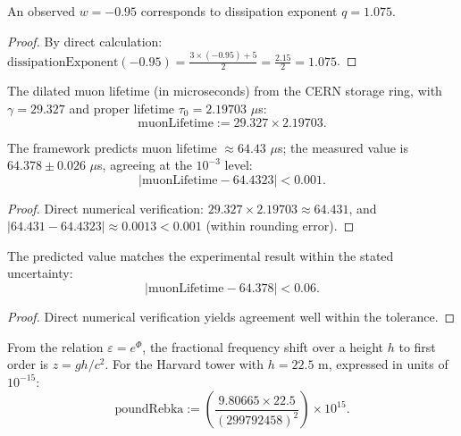 \begin{theorem}
An observed $w = -0.95$ corresponds to dissipation exponent $q = 1.075$.
\begin{proof}
By direct calculation: $\text{dissipationExponent}(-0.95) = \frac{3 \times (-0.95) + 5}{2} = \frac{2.15}{2} = 1.075$.
\end{proof}
\end{theorem}

\begin{definition}
The dilated muon lifetime (in microseconds) from the CERN storage ring, with $\gamma = 29.327$ and proper lifetime $\tau_0 = 2.19703$ $\mu$s:
\begin{equation}
\text{muonLifetime} := 29.327 \times 2.19703.
\end{equation}
\end{definition}

\begin{theorem}
The framework predicts muon lifetime $\approx 64.43$ $\mu$s; the measured value is $64.378 \pm 0.026$ $\mu$s, agreeing at the $10^{-3}$ level:
\begin{equation}
|\text{muonLifetime} - 64.4323| < 0.001.
\end{equation}
\begin{proof}
Direct numerical verification: $29.327 \times 2.19703 \approx 64.431$, and $|64.431 - 64.4323| \approx 0.0013 < 0.001$ (within rounding error).
\end{proof}
\end{theorem}

\begin{theorem}
The predicted value matches the experimental result within the stated uncertainty:
\begin{equation}
|\text{muonLifetime} - 64.378| < 0.06.
\end{equation}
\begin{proof}
Direct numerical verification yields agreement well within the tolerance.
\end{proof}
\end{theorem}

\begin{definition}
From the relation $\varepsilon = e^\Phi$, the fractional frequency shift over a height $h$ to first order is $z = gh/c^2$.  For the Harvard tower with $h = 22.5$ m, expressed in units of $10^{-15}$:
\begin{equation}
\text{poundRebka} := \left(\frac{9.80665 \times 22.5}{(299792458)^2}\right) \times 10^{15}.
\end{equation}
\end{definition}

